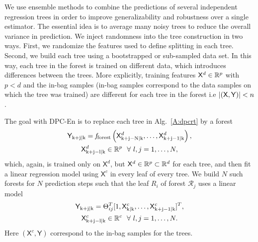 We use ensemble methods \cite{Friedman2001} to combine the predictions of several independent regression trees in order to improve generalizability and robustness over a single estimator. 
The essential idea is to average many noisy trees to reduce the overall variance in prediction.
We inject randomness into the tree construction in two ways. First, we randomize the features used to define splitting in each tree.
Second, we build each tree using a bootstrapped or sub-sampled data set.
In this way, each tree in the forest is trained on different data, which introduces differences between the trees. More explicitly, training features $\mathsf{X}^d \in \mathbb{R}^p$ with $p<d$ and the in-bag samples (in-bag samples correspond to the data samples on which the tree was trained) are different for each tree in the forest i.e $|(\mathsf{X},\mathsf{Y})|<n$.

The goal with DPC-En is to replace each tree in Alg.~\ref{A:dpcrt} by a forest
\begin{gather}
\label{E:model_forest}
\mathsf{Y}_{\mathrm{k+j|k}} = \mathit{f}_{\mathrm{forest}} \left( \mathsf{X}^d_{\mathrm{k+j-N|k}} ,\dots,\mathsf{X}^d_{\mathrm{k+j-1|k}}  \right), \\ \nonumber
\mathsf{X}^d_{\mathrm{k+j-l|k}} \in \mathbb{R}^p \  \ \forall \ l,j=1,\dots,N,
\end{gather}
which, again, is trained only on $\mathsf{X}^d$, but $\mathsf{X}^d \in \mathbb{R}^p \subset \mathbb{R}^d$ for each tree,  and then fit a linear regression model using $\mathsf{X}^c$ in every leaf of every tree. We build $N$ such forests for $N$ prediction steps such that the leaf $R_i$ of forest $\mathcal{R}_j$ uses a linear model
\begin{gather}
\label{E:model_leaf_forest}
\mathsf{Y}_{\mathrm{k+j|k}} =  \Theta^T_{ij} [1,\mathsf{X}^c_{\mathrm{k|k}},\dots,\mathsf{X}^c_{\mathrm{k+j-1|k}} ]^T, \\ \nonumber
\mathsf{X}^c_{\mathrm{k+j-l|k}} \in \mathbb{R}^c \  \ \forall \ l,j=1,\dots,N.
\end{gather}
Here $(\mathsf{X}^c,\mathsf{Y})$ correspond to the in-bag samples for the trees.

